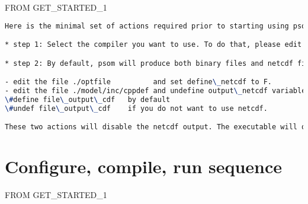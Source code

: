 \documentclass[12pt,letterpaper,titlepage]{article}
\begin{document}
FROM GET\_STARTED\_1

\begin{lstlisting}[language=TeX, breaklines]
Here is the minimal set of actions required prior to starting using psom.

* step 1: Select the compiler you want to use. To do that, please edit the ./optfile to set the compiler you will use:       fcomp=...  (ifort, pgf95 etc.). If compiler is modified, the user is encouraged to scan through the ./optfile to make other necessary modifications (e.g., the directory of the gotm library if activated, the define\_parallel flag, etc.).

* step 2: By default, psom will produce both binary files and netcdf files. If you do not have netcdf library installed or smply do not want to use netcdf files, 

- edit the file ./optfile          and set define\_netcdf to F.
- edit the file ./model/inc/cppdef and undefine output\_netcdf variable: 
\#define file\_output\_cdf   by default
\#undef file\_output\_cdf    if you do not want to use netcdf.

These two actions will disable the netcdf output. The executable will only produce binary files.
\end{lstlisting}

\section{Configure, compile, run sequence}

FROM GET\_STARTED\_1
\end{document}

